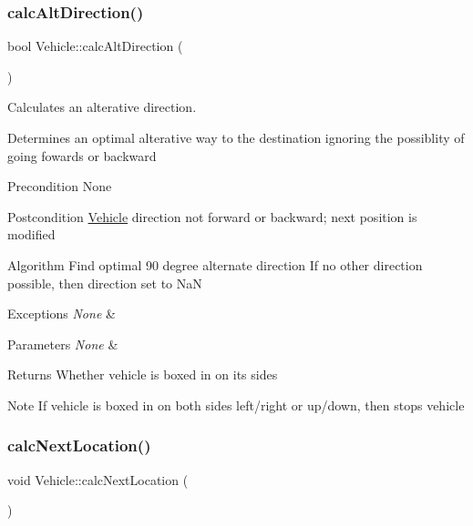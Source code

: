 \subsubsection{\texorpdfstring{calc\+Alt\+Direction()}{calcAltDirection()}}
{\footnotesize\ttfamily bool Vehicle\+::calc\+Alt\+Direction (\begin{DoxyParamCaption}{ }\end{DoxyParamCaption})\hspace{0.3cm}{\ttfamily [protected]}}



Calculates an alterative direction. 

Determines an optimal alterative way to the destination ignoring the possiblity of going fowards or backward

\begin{DoxyPrecond}{Precondition}
None
\end{DoxyPrecond}
\begin{DoxyPostcond}{Postcondition}
\hyperlink{class_vehicle}{Vehicle} direction not forward or backward; next position is modified
\end{DoxyPostcond}
\begin{DoxyParagraph}{Algorithm}
Find optimal 90 degree alternate direction If no other direction possible, then direction set to NaN
\end{DoxyParagraph}

\begin{DoxyExceptions}{Exceptions}
{\em None} & \\
\hline
\end{DoxyExceptions}

\begin{DoxyParams}{Parameters}
{\em None} & \\
\hline
\end{DoxyParams}
\begin{DoxyReturn}{Returns}
Whether vehicle is boxed in on its sides
\end{DoxyReturn}
\begin{DoxyNote}{Note}
If vehicle is boxed in on both sides left/right or up/down, then stops vehicle 
\end{DoxyNote}
\hypertarget{class_vehicle_ac9912b051f2247d7a297a4e9e7657a6b}{}\label{class_vehicle_ac9912b051f2247d7a297a4e9e7657a6b} 
\subsubsection{\texorpdfstring{calc\+Next\+Location()}{calcNextLocation()}}
{\footnotesize\ttfamily void Vehicle\+::calc\+Next\+Location (\begin{DoxyParamCaption}{ }\end{DoxyParamCaption})\hspace{0.3cm}{\ttfamily [protected]}}



